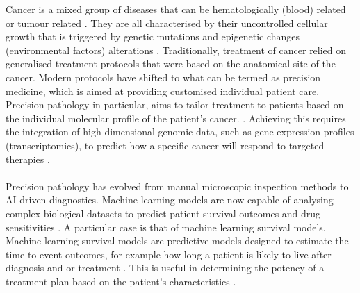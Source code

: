 Cancer is a mixed group of diseases that can be hematologically (blood) related or 
tumour related \cite{NCI}. 
They are all characterised by their uncontrolled cellular growth that is triggered by 
genetic mutations and epigenetic changes (environmental factors) alterations 
\cite{NCI}. Traditionally, treatment of cancer relied on 
generalised treatment protocols that were based on the anatomical site of the cancer. 
Modern protocols have shifted to what can be termed as precision medicine, which is 
aimed at providing customised individual patient care. Precision pathology in particular, 
aims to tailor treatment to patients based on the individual molecular profile of the 
patient’s cancer. \cite{Klauschen2024}. Achieving this requires the integration of 
high-dimensional genomic data, such as gene expression profiles (transcriptomics), 
to predict how a specific cancer will respond to targeted therapies \cite{Klauschen2024}.
\\\\
Precision pathology has evolved from manual microscopic inspection methods to AI-driven 
diagnostics. Machine learning models are now capable of analysing complex biological 
datasets to predict patient survival outcomes and drug sensitivities \cite{Kovalev2021}. 
A particular case is that of machine learning survival models. Machine learning survival 
models are predictive models designed to estimate the time-to-event outcomes, for example 
how long a patient is likely to live after diagnosis and or treatment \cite{Kovalev2021}. 
This is useful in determining the potency of a treatment plan based on the patient's characteristics 
\cite{Kovalev2021}. 

